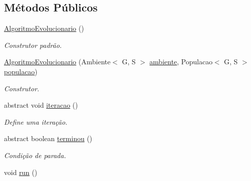 \subsection*{Métodos Públicos}
\begin{DoxyCompactItemize}
\item 
\hyperlink{classic_1_1populacional_1_1algoritmo_1_1_algoritmo_evolucionario_3_01_gextends_01_number_01_6_co1efdb05fe19a950b8d1e9e15f7d06254_a44bcf88506c92fbaf65cb3b223015004}{Algoritmo\-Evolucionario} ()
\begin{DoxyCompactList}\small\item\em Construtor padrão. \end{DoxyCompactList}\item 
\hyperlink{classic_1_1populacional_1_1algoritmo_1_1_algoritmo_evolucionario_3_01_gextends_01_number_01_6_co1efdb05fe19a950b8d1e9e15f7d06254_a5a2ad6905fc5f843bdc02d17ac9245e6}{Algoritmo\-Evolucionario} (Ambiente$<$ G, S $>$ \hyperlink{classic_1_1populacional_1_1algoritmo_1_1_algoritmo_evolucionario_3_01_gextends_01_number_01_6_co1efdb05fe19a950b8d1e9e15f7d06254_a7ccec051269f59db009703ae09400f54}{ambiente}, Populacao$<$ G, S $>$ \hyperlink{classic_1_1populacional_1_1algoritmo_1_1_algoritmo_evolucionario_3_01_gextends_01_number_01_6_co1efdb05fe19a950b8d1e9e15f7d06254_ac925832558d94f84dc90252371f8cb32}{populacao})
\begin{DoxyCompactList}\small\item\em Construtor. \end{DoxyCompactList}\item 
abstract void \hyperlink{classic_1_1populacional_1_1algoritmo_1_1_algoritmo_evolucionario_3_01_gextends_01_number_01_6_co1efdb05fe19a950b8d1e9e15f7d06254_a1f67fd61bb31bc952dd7a8afd03ad1af}{iteracao} ()
\begin{DoxyCompactList}\small\item\em Define uma iteração. \end{DoxyCompactList}\item 
abstract boolean \hyperlink{classic_1_1populacional_1_1algoritmo_1_1_algoritmo_evolucionario_3_01_gextends_01_number_01_6_co1efdb05fe19a950b8d1e9e15f7d06254_a81f74bfb66080cfc85593d997d4f973c}{terminou} ()
\begin{DoxyCompactList}\small\item\em Condição de parada. \end{DoxyCompactList}\item 
void \hyperlink{classic_1_1populacional_1_1algoritmo_1_1_algoritmo_evolucionario_3_01_gextends_01_number_01_6_co1efdb05fe19a950b8d1e9e15f7d06254_a0fd82664e0e022b2e965923560830f9a}{run} ()

\end{DoxyCompactItemize}
